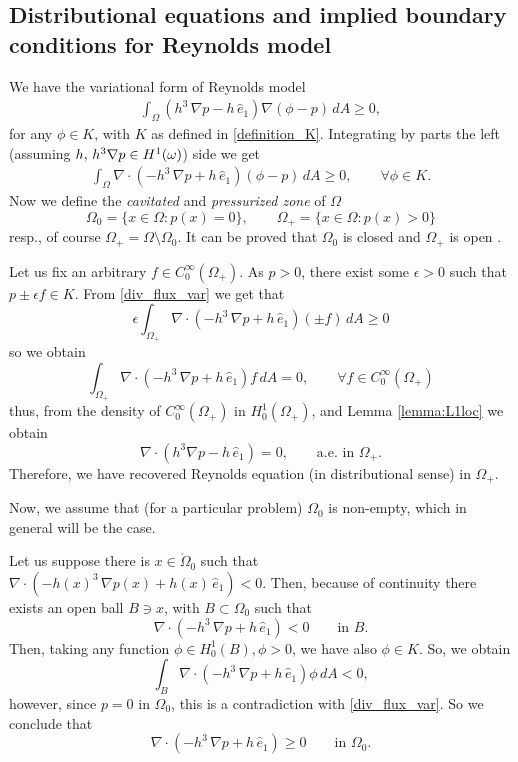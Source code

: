 \subsection{Distributional equations and implied boundary conditions for Reynolds model}
We have the variational form of Reynolds model
\begin{align*}
\int_\Omega \left(h^3\,\nabla p-h\,\hat{e}_1\right) \nabla(\phi-p)\,dA  \geq 0  ,
\end{align*}
for any $\phi\in K$, with $K$ as defined in \eqref*{definition_K}. Integrating by parts the left (assuming $h,\,h^3\nabla p\in{H^1(\omega)}$) side we get
\begin{align}
\int_\Omega \nabla\cdot\left(-h^3\,\nabla p+h\,\hat{e}_1\right) \left(\phi-p\right)\,dA  \geq 0,\qquad \forall \phi \in K.\label{eq:div_flux_var}
\end{align}
Now we define the \emph{cavitated} and \emph{pressurized zone} of $\Omega$ $$\Omega_0=\{x\in \Omega:p(x) = 0\},\qquad \Omega_+=\{x\in \Omega:p(x) >0\}$$
resp., of course $\Omega_+=\Omega \setminus \Omega_0$. It can be proved that $\Omega_0$ is closed and $\Omega_+$ is open \cite{kinderlehrer1980}.

Let us fix an arbitrary $f\in C^\infty_0(\Omega_+)$. As $p>0$, there exist some $\epsilon>0$ such that $p\pm \epsilon f\in K$. From \eqref{div_flux_var} we get that $$\epsilon\int_{\Omega_+} \nabla\cdot\left(-h^3\,\nabla p+h\,\hat{e}_1\right) \left(\pm f\right)\,dA  \geq 0$$
so we obtain 
$$\int_{\Omega_+} \nabla\cdot\left(-h^3\,\nabla p+h\,\hat{e}_1\right) f\,dA  = 0,\qquad \forall f\in C_0^\infty (\Omega_+)$$
thus, from the density of $C_0^\infty (\Omega_+)$ in $H_0^1(\Omega_+)$, and Lemma \ref{lemma:L1loc} we obtain
\begin{equation}
\nabla\cdot(h^3\nabla p-h\,\hat{e}_1)=0,\qquad\text{a.e. in }\Omega_+.\label{eq:flux_J_omegaplus}
\end{equation}
Therefore, we have recovered Reynolds equation (in distributional sense) in $\Omega_+$.

Now, we assume that (for a particular problem) $\Omega_0$ is non-empty, which in general will be the case. 

Let us suppose there is $x\in\mathring{\Omega}_0$ such that $\nabla\cdot\left(-h(x)^3\,\nabla p(x)+h(x)\,\hat{e}_1\right)<0$. Then, because of continuity there exists an open ball $B\ni x$, with $B\subset \Omega_0$ such that $$\nabla\cdot\left(-h^3\,\nabla p+h\,\hat{e}_1\right)<0\qquad\text{in }B.$$ Then, taking any function $\phi\in H_0^1(B),\phi > 0$, we have also $\phi\in K$. So, we obtain
$$\int_B \nabla\cdot\left(-h^3\,\nabla p+h\,\hat{e}_1\right) \phi\,dA  < 0,$$
however, since $p=0$ in $\Omega_0$, this is a contradiction with \eqref{div_flux_var}. So we conclude that
\begin{equation}
\nabla\cdot\left(-h^3\,\nabla p+h\,\hat{e}_1\right)\geq 0\qquad \text{in }\Omega_0 \label{eq:flux_J_omega0}.
\end{equation}

